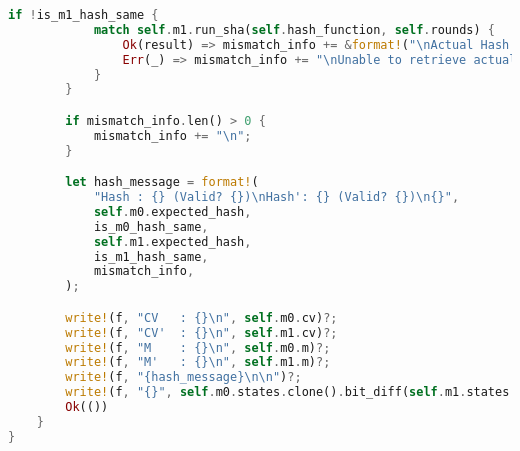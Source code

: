 \begin{lstlisting}[language=rust, caption={verification/colliding\_pair.rs}]
		if !is_m1_hash_same {
			match self.m1.run_sha(self.hash_function, self.rounds) {
				Ok(result) => mismatch_info += &format!("\nActual Hash': {}", result.hash),
				Err(_) => mismatch_info += "\nUnable to retrieve actual hash for M'!",
			}
		}

		if mismatch_info.len() > 0 {
			mismatch_info += "\n";
		}

		let hash_message = format!(
			"Hash : {} (Valid? {})\nHash': {} (Valid? {})\n{}",
			self.m0.expected_hash,
			is_m0_hash_same,
			self.m1.expected_hash,
			is_m1_hash_same,
			mismatch_info,
		);

		write!(f, "CV   : {}\n", self.m0.cv)?;
		write!(f, "CV'  : {}\n", self.m1.cv)?;
		write!(f, "M    : {}\n", self.m0.m)?;
		write!(f, "M'   : {}\n", self.m1.m)?;
		write!(f, "{hash_message}\n\n")?;
		write!(f, "{}", self.m0.states.clone().bit_diff(self.m1.states.clone()))?;
		Ok(())
	}
}
\end{lstlisting}

